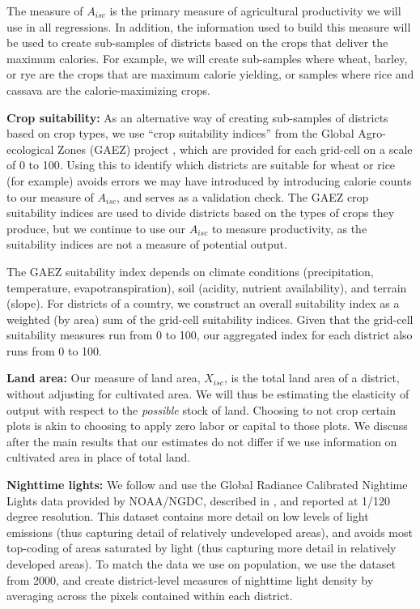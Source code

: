\documentclass[11pt]{article}
\begin{document}
The measure of $A_{isc}$ is the primary measure of agricultural productivity we will use in all regressions. In addition, the information used to build this measure will be used to create sub-samples of districts based on the crops that deliver the maximum calories. For example, we will create sub-samples where wheat, barley, or rye are the crops that are maximum calorie yielding, or samples where rice and cassava are the calorie-maximizing crops.

\vspace{.5cm}\noindent\textbf{Crop suitability:} As an alternative way of creating sub-samples of districts based on crop types, we use ``crop suitability indices'' from the Global Agro-ecological Zones (GAEZ) project \citep{gaez}, which are provided for each grid-cell on a scale of 0 to 100. Using this to identify which districts are suitable for wheat or rice (for example) avoids errors we may have introduced by introducing calorie counts to our measure of $A_{isc}$, and serves as a validation check. The GAEZ crop suitability indices are used to divide districts based on the types of crops they produce, but we continue to use our $A_{isc}$ to measure productivity, as the suitability indices are not a measure of potential output.

The GAEZ suitability index depends on climate conditions (precipitation, temperature, evapotranspiration), soil (acidity, nutrient availability), and terrain (slope). For districts of a country, we construct an overall suitability index as a weighted (by area) sum of the grid-cell suitability indices. Given that the grid-cell suitability measures run from 0 to 100, our aggregated index for each district also runs from 0 to 100.

\vspace{.5cm}\noindent\textbf{Land area:} Our measure of land area, $X_{isc}$, is the total land area of a district, without adjusting for cultivated area. We will thus be estimating the elasticity of output with respect to the \textit{possible} stock of land. Choosing to not crop certain plots is akin to choosing to apply zero labor or capital to those plots. We discuss after the main results that our estimates do not differ if we use information on cultivated area in place of total land.

\vspace{.5cm}\noindent\textbf{Nighttime lights:} We follow \citet{hssw2016} and use the Global Radiance Calibrated Nightime Lights data provided by NOAA/NGDC, described in \citet{Elvidge1999}, and reported at 1/120 degree resolution. This dataset contains more detail on low levels of light emissions (thus capturing detail of relatively undeveloped areas), and avoids most top-coding of areas saturated by light (thus capturing more detail in relatively developed areas). To match the data we use on population, we use the dataset from 2000, and create district-level measures of nighttime light density by averaging across the pixels contained within each district.
\end{document}
